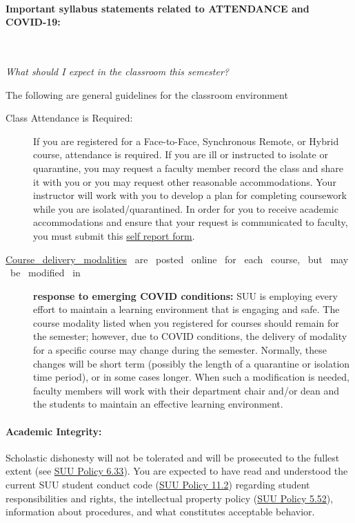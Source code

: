\documentclass[12pt, letterpaper]{article}
\begin{document}
\paragraph{Important syllabus statements related to ATTENDANCE and COVID-19:} ~

\noindent\emph{What should I expect in the classroom this semester?}

\noindent The following are general guidelines for the classroom environment
\begin{description}
	\item[Class Attendance is Required:] If you are registered for a Face-to-Face, Synchronous Remote, or Hybrid course, attendance is required. If you are ill or instructed to isolate or quarantine, you may request a faculty member record the class and share it with you or you may request other reasonable accommodations. Your instructor will work with you to develop a plan for completing coursework while you are isolated/quarantined. In order for you to receive academic accommodations and ensure that your request is communicated to faculty, you must submit this \href{https://my.suu.edu/covid/selfreport/}{self report form}.
	\item[\href{https://www.suu.edu/registrar/onlinehybrid.html}{Course ~delivery ~modalities} ~are ~posted ~online ~for ~each ~course, ~but ~may ~be ~modified ~in] \textbf{response to emerging COVID conditions:} SUU is employing every effort to maintain a learning environment that is engaging and safe. The course modality listed when you registered for courses should remain for the semester; however, due to COVID conditions, the delivery of modality for a specific course may change during the semester. Normally, these changes will be short term (possibly the length of a quarantine or isolation time period), or in some cases longer. When such a modification is needed, faculty members will work with their department chair and/or dean and the students to maintain an effective learning environment.
\end{description}

\paragraph{Academic Integrity:}
Scholastic dishonesty will not be tolerated and will be prosecuted to the fullest extent (see \href{https://www.suu.edu/policies/06/33.html}{SUU Policy 6.33}). You are expected to have read and understood the current SUU student conduct code (\href{https://www.suu.edu/policies/11/02.html}{SUU Policy 11.2}) regarding student responsibilities and rights, the intellectual property policy (\href{https://www.suu.edu/policies/05/52.html}{SUU Policy 5.52}), information about procedures, and what constitutes acceptable behavior.
\end{document}
